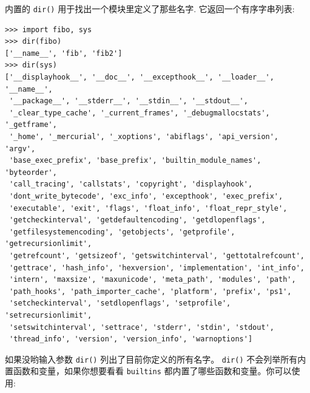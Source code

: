 \documentclass[10pt,a4paper,UTF8]{article}
\begin{document}
内置的 \texttt{dir()} 用于找出一个模块里定义了那些名字. 它返回一个有序字串列表:
\begin{verbatim}
>>> import fibo, sys
>>> dir(fibo)
['__name__', 'fib', 'fib2']
>>> dir(sys)  
['__displayhook__', '__doc__', '__excepthook__', '__loader__', '__name__',
 '__package__', '__stderr__', '__stdin__', '__stdout__',
 '_clear_type_cache', '_current_frames', '_debugmallocstats', '_getframe',
 '_home', '_mercurial', '_xoptions', 'abiflags', 'api_version', 'argv',
 'base_exec_prefix', 'base_prefix', 'builtin_module_names', 'byteorder',
 'call_tracing', 'callstats', 'copyright', 'displayhook',
 'dont_write_bytecode', 'exc_info', 'excepthook', 'exec_prefix',
 'executable', 'exit', 'flags', 'float_info', 'float_repr_style',
 'getcheckinterval', 'getdefaultencoding', 'getdlopenflags',
 'getfilesystemencoding', 'getobjects', 'getprofile', 'getrecursionlimit',
 'getrefcount', 'getsizeof', 'getswitchinterval', 'gettotalrefcount',
 'gettrace', 'hash_info', 'hexversion', 'implementation', 'int_info',
 'intern', 'maxsize', 'maxunicode', 'meta_path', 'modules', 'path',
 'path_hooks', 'path_importer_cache', 'platform', 'prefix', 'ps1',
 'setcheckinterval', 'setdlopenflags', 'setprofile', 'setrecursionlimit',
 'setswitchinterval', 'settrace', 'stderr', 'stdin', 'stdout',
 'thread_info', 'version', 'version_info', 'warnoptions']
\end{verbatim}

如果没哟输入参数 \texttt{dir()} 列出了目前你定义的所有名字。 \texttt{dir()} 不会列举所有内置函数和变量，如果你想要看看  \texttt{builtins} 都内置了哪些函数和变量。你可以使用:
\end{document}
